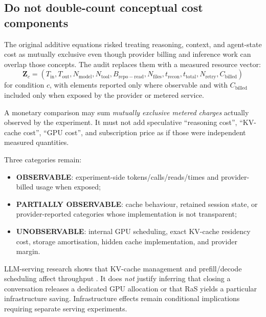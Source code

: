 \subsection{Do not double-count conceptual cost components}

The original additive equations risked treating reasoning, context, and agent-state cost as mutually exclusive even though provider billing and inference work can overlap those concepts. The audit replaces them with a measured resource vector:
\begin{equation}
\mathbf{Z}_c=
(T_{\mathrm{in}},T_{\mathrm{out}},N_{\mathrm{model}},N_{\mathrm{tool}},
B_{\mathrm{repo-read}},N_{\mathrm{files}},t_{\mathrm{recon}},t_{\mathrm{total}},
N_{\mathrm{retry}},C_{\mathrm{billed}})
\label{eq:resource-vector}
\end{equation}
for condition $c$, with elements reported only where observable and with $C_{\mathrm{billed}}$ included only when exposed by the provider or metered service.



A monetary comparison may sum \emph{mutually exclusive metered charges} actually observed by the experiment. It must not add speculative “reasoning cost”, “KV-cache cost”, “GPU cost”, and subscription price as if those were independent measured quantities.

Three categories remain:
\begin{itemize}
    \item \textbf{OBSERVABLE}: experiment-side tokens/calls/reads/times and provider-billed usage when exposed;
    \item \textbf{PARTIALLY OBSERVABLE}: cache behaviour, retained session state, or provider-reported categories whose implementation is not transparent;
    \item \textbf{UNOBSERVABLE}: internal GPU scheduling, exact KV-cache residency cost, storage amortisation, hidden cache implementation, and provider margin.
\end{itemize}

LLM-serving research shows that KV-cache management and prefill/decode scheduling affect throughput \citep{kwon2023vllm,zhong2024distserve,qin2024mooncake}. It does \emph{not} justify inferring that closing a conversation releases a dedicated GPU allocation or that RaS yields a particular infrastructure saving. Infrastructure effects remain conditional implications requiring separate serving experiments.

